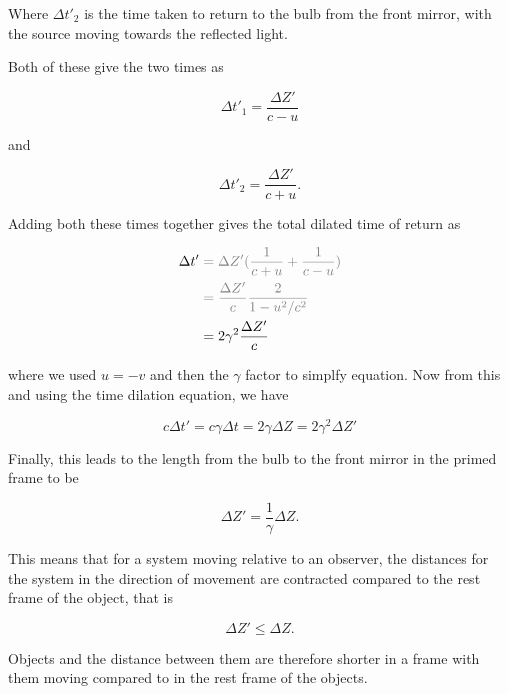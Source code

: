 Where ${\Delta t'_2}$ is the time taken to return to the bulb from the front mirror, with the source moving towards the reflected light.

Both of these give the two times as

\begin{equation}
	{\Delta t'_1} = \frac{\Delta  Z'}{{c} - {u}}
\end{equation}

and

\begin{equation}
	{\Delta t'_2} = \frac{{\Delta  Z'}}{{c} + {u}}.
\end{equation}

Adding both these times together gives the total dilated time of return as

\begin{equation}
	\begin{aligned}
		{\Delta t{'}} & \color{gray} = {\Delta  Z'}(\frac{1}{{c} + {u}} + \frac{1}{{c} - {u}}) \\
		              & \color{gray} = \frac{\Delta  Z'}{c}\frac{2}{1- {u}^2/{c}^2}            \\
		              & =  2{\gamma}^2 \frac{\Delta  Z'}{c}
	\end{aligned}
\end{equation}

where we used ${u}=-{v}$ and then the ${\gamma}$ factor to simplfy equation.
Now from this and using the time dilation equation, we have

\begin{equation}
	{c}{\Delta t{'}} = {c}{\gamma} {\Delta t} = 2{\gamma} {\Delta Z} = 2{\gamma}^2 {\Delta  Z'}
\end{equation}

Finally, this leads to the length from the bulb to the front mirror in the primed frame to be

\begin{equation}
	{\Delta  Z'} = \frac{1}{{\gamma}}{\Delta  Z}.
\end{equation}

This means that for a system moving relative to an observer, the distances for the system in the direction of movement are contracted compared to the rest frame of the object, that is

\begin{equation}
	{\Delta  Z'} \leq {\Delta  Z}.
\end{equation}

Objects and the distance between them are therefore shorter in a frame with them moving compared to in the rest frame of the objects.

